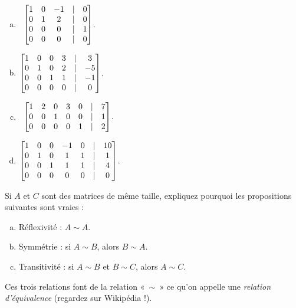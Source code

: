 \begin{prob}
\begin{enumerate}[a)]
\item\sov~$ \bmatrix 1 & 0 & -1 &|&0 \\
 0 & 1 & 2 &|&0\\
 0 & 0 & 0&|&1 \\
 0 & 0 & 0 &|&0\endbmatrix$.
\medskip
 
\item $\bmatrix  1 & 0 & 0 & 3 &|& 3 \\
 0 & 1 & 0 & 2 &|& -5 \\
 0 & 0 & 1 & 1 &|& -1 \\
 0 & 0 & 0 & 0 &|& 0\endbmatrix$.
\medskip
 
\item\sov~$\bmatrix  1 & 2 & 0 & 3 & 0 &|& 7 \\
 0 & 0 & 1 & 0 & 0 &|& 1 \\
 0 & 0 & 0 & 0 & 1 &|& 2 \endbmatrix$.
\medskip
 

\item $ \bmatrix 
1& 0& 0& -1& 0&|& 10\\  
0& 1& 0& 1&1&|& 1\\ 
0& 0& 1& 1& 1&|& 4\\ 
0& 0& 0& 0& 0&|& 0\endbmatrix$.
\medskip
 
\end{enumerate}

\end{prob} 

\begin{prob} \label{prob12.3}
Si $A$ et $C$ sont des matrices de même taille, expliquez pourquoi les propositions suivantes sont vraies :

\begin{enumerate}[a)]
\item Réflexivité : $A \sim A$.
\item Symmétrie : si $A \sim B$, alors $B \sim A$.
\item Transitivité : si $A \sim B$ et $B \sim C$, alors $A \sim C$.
\end{enumerate}
Ces trois relations font de la relation «~$\sim$~» ce qu'on appelle une \emph{relation d'équivalence} (regardez sur Wikipédia !).
\end{prob}  